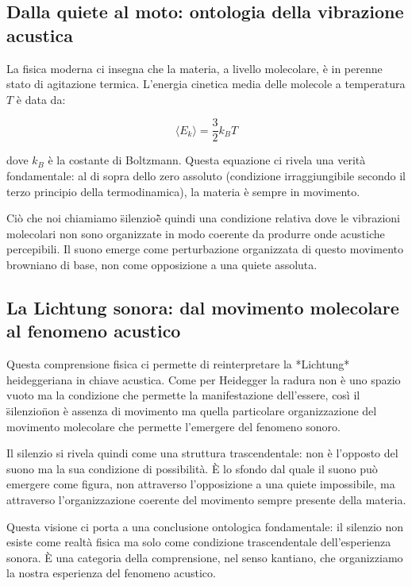 \documentclass[a4paper,11pt]{article}
\begin{document}
\subsection{Dalla quiete al moto: ontologia della vibrazione acustica}

La fisica moderna ci insegna che la materia, a livello molecolare, è in
perenne stato di agitazione termica. L'energia cinetica media delle
molecole a temperatura $T$ è data da:

\begin{equation}
\langle E_k \rangle = \frac{3}{2}k_BT
\end{equation}


dove $k_B$ è la costante di Boltzmann. Questa equazione ci rivela una
verità fondamentale: al di sopra dello zero assoluto (condizione
irraggiungibile secondo il terzo principio della termodinamica), la
materia è sempre in movimento.

Ciò che noi chiamiamo \"silenzio\" è quindi una condizione relativa dove
le vibrazioni molecolari non sono organizzate in modo coerente da
produrre onde acustiche percepibili. Il suono emerge come perturbazione
organizzata di questo movimento browniano di base, non come opposizione
a una quiete assoluta.

\subsection{La Lichtung sonora: dal movimento molecolare al fenomeno acustico}

Questa comprensione fisica ci permette di reinterpretare la *Lichtung*
heideggeriana in chiave acustica. Come per Heidegger la radura non è uno
spazio vuoto ma la condizione che permette la manifestazione
dell'essere, così il \"silenzio\" non è assenza di movimento ma quella
particolare organizzazione del movimento molecolare che permette
l'emergere del fenomeno sonoro.

Il silenzio si rivela quindi come una struttura trascendentale: non è
l'opposto del suono ma la sua condizione di possibilità. È lo sfondo dal
quale il suono può emergere come figura, non attraverso l'opposizione a
una quiete impossibile, ma attraverso l'organizzazione coerente del
movimento sempre presente della materia.

Questa visione ci porta a una conclusione ontologica fondamentale: il
silenzio non esiste come realtà fisica ma solo come condizione
trascendentale dell'esperienza sonora. È una categoria della
comprensione, nel senso kantiano, che organizziamo la nostra esperienza
del fenomeno acustico.
\end{document}
